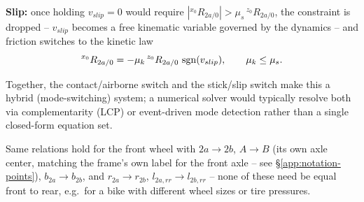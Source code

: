 \textbf{Slip:} once holding $v_{slip}=0$ would require $|{}^{x_0}R_{2a/0}|>\mu_s\,{}^{z_0}R_{2a/0}$, the constraint is dropped -- $v_{slip}$ becomes a free kinematic variable governed by the dynamics -- and friction switches to the kinetic law
\begin{equation}
    {}^{x_0}R_{2a/0} = -\mu_k\,{}^{z_0}R_{2a/0}\,\operatorname{sgn}(v_{slip}), \qquad \mu_k \le \mu_s.
\end{equation}

Together, the contact/airborne switch and the stick/slip switch make this a hybrid (mode-switching) system; a numerical solver would typically resolve both via complementarity (LCP) or event-driven mode detection rather than a single closed-form equation set.

Same relations hold for the front wheel with $2a\to2b$, $A\to B$ (its own axle center, matching the frame's own label for the front axle -- see \S\ref{app:notation-points}), $b_{2a}\to b_{2b}$, and $r_{2a}\to r_{2b}$, $l_{2a,rr}\to l_{2b,rr}$ -- none of these need be equal front to rear, e.g.\ for a bike with different wheel sizes or tire pressures.

